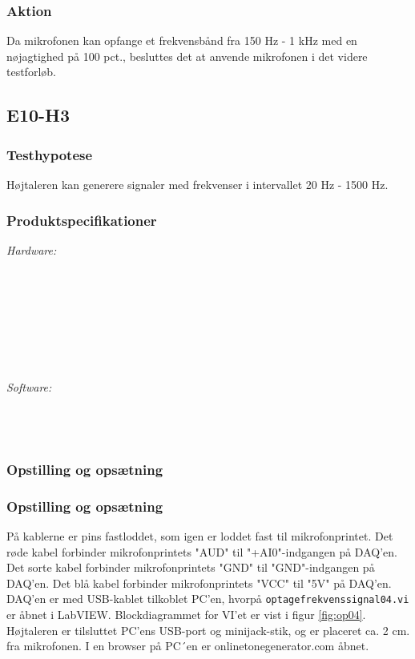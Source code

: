 		\subsubsection{Aktion}
		Da mikrofonen kan opfange et frekvensbånd fra 150 Hz - 1 kHz med en nøjagtighed på 100 pct., besluttes det at anvende mikrofonen i det videre testforløb. 
		
\subsection{E10-H3}
\label{subsec:E10}
		\subsubsection{Testhypotese}
		Højtaleren  kan generere signaler med frekvenser i intervallet 20 Hz - 1500 Hz.
		
		\subsubsection{Produktspecifikationer}
	
			\textit{Hardware:}\\
			\elektretto\\
			\pinstre\\
			\mikrofonkabel\\
			\krympeflex\\
			\daq\\
			\daqusb\\	
			\\		
			\PC
	
			\textit{Software:}\\
			\labview\\
			\daqsoft\\
			\onlineg\\
	
		\subsubsection{Opstilling og opsætning}
		\subsubsection{Opstilling og opsætning}
		På kablerne er pins fastloddet, som igen er loddet fast til mikrofonprintet. Det røde kabel forbinder mikrofonprintets "AUD"{} til "+AI0"{}-indgangen på DAQ'en. Det sorte kabel forbinder mikrofonprintets "GND"{} til "GND"{}-indgangen på DAQ'en. Det blå kabel forbinder mikrofonprintets "VCC"{} til "5V"{} på DAQ'en. DAQ'en er med USB-kablet tilkoblet PC'en, hvorpå \texttt{optagefrekvenssignal04.vi} er åbnet i LabVIEW. Blockdiagrammet for VI'et er vist i figur \ref{fig:op04}. Højtaleren er tilsluttet PC'ens USB-port og minijack-stik, og er placeret ca. 2 cm. fra mikrofonen. I en browser på PC´en er onlinetonegenerator.com åbnet.       
	
